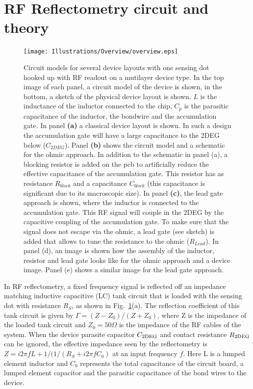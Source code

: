 \documentclass[twocolumn]{article}
\begin{document}
	

\section{RF Reflectometry circuit and theory} %
\label{sec:rf_reflectometry_circuit_and_theory}


\begin{figure}[h]
	\texttt{[image: Illustrations/Overview/overview.eps]}
	\caption{Circuit models for several device layouts with one sensing dot hooked up with RF readout on a mutilayer device type.  In the top image of each panel, a circuit model of the device is shown, in the bottom, a sketch of the physical device layout is shown. $L$ is the inductance of the inductor connected to the chip, $C_p$ is the parasitic capacitance of the inductor, the bondwire and the accumulation gate. In panel \textbf{(a)} a classical device layout is shown. In such a design the accumulation gate will have a large capacitance to the 2DEG below ($C_{2DEG}$). Panel \textbf{(b)} shows the circuit model and a schematic for the ohmic approach. In addition to the schematic in panel (a), a blocking resistor is added on the pcb to artificially reduce the effective capacitance of the accumulation gate. This resistor has as resistance $R_{block}$ and a capacitance $C_{block}$ (this capacitance is significant due to its macroscopic size). In panel \textbf{(c)}, the lead gate approach is shown, where the inductor is connected to the accumulation gate. This RF signal will couple in the 2DEG by the capacitive coupling of the accumulation gate. To make sure that the signal does not escape via the ohmic, a lead gate (see sketch) is added that allows to tune the resistance to the ohmic ($R_{Lead}$). In panel (d), an image is shown how the assembly of the inductor, resistor and lead gate looks like for the ohmic approach and a device image. Panel (e) shows a similar image for the lead gate approach.}
	\label{fig:overview}
\end{figure}

\label{sub:why_sige_is_very_different_from_the_simples_reflectometry}
In RF reflectometry, a fixed frequency signal is reflected off an impedance matching inductive capacitive (LC) tank circuit that is loaded with the sensing dot with resistance $R_S$, as shown in Fig.\ \ref{fig:overview}(a). The reflection coefficient of this tank circuit is given by $\Gamma=(Z-Z_0)/(Z+Z_0)$, where Z is the impedance of the loaded tank circuit and $Z_0 = 50 \Omega$ is the impedance of the RF cables of the system. When the device parasite capacitor $C_{\rm 2DEG}$ and contact resistance $R_{\rm 2DEG}$ can be ignored, the effective impedance seen by the reflectometry is $Z = i2\pi fL + 1/(1/(R_S + i2\pi fC_0)$ at an input frequency $f$. Here L is a lumped element inductor and $C_0$ represents the total capacitance of the circuit board, a lumped element capacitor and the parasitic capacitance of the bond wires to the device. 
\end{document}
